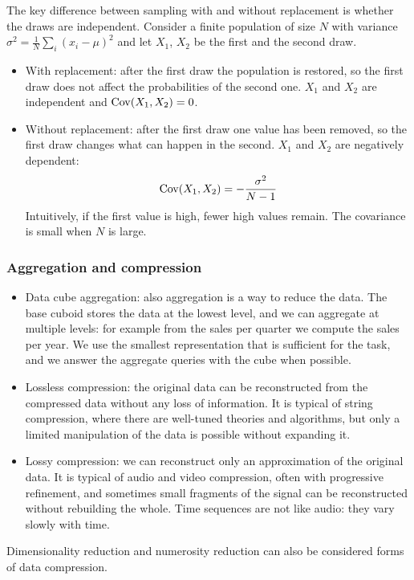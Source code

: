 The key difference between sampling with and without replacement is whether the draws are independent. Consider a finite population of size $N$ with variance $\sigma^2 = \frac{1}{N}\sum_i (x_i-\mu)^2$ and let $X_1$, $X_2$ be the first and the second draw.
\begin{itemize}
    \item With replacement: after the first draw the population is restored, so the first draw does not affect the probabilities of the second one. $X_1$ and $X_2$ are independent and $\operatorname{Cov}(X_1,X_2)=0$.
    \item Without replacement: after the first draw one value has been removed, so the first draw changes what can happen in the second. $X_1$ and $X_2$ are negatively dependent:
    \[
        \operatorname{Cov}(X_1,X_2) = -\frac{\sigma^2}{N-1}
    \]
    Intuitively, if the first value is high, fewer high values remain. The covariance is small when $N$ is large.
\end{itemize}

\subsubsection{Aggregation and compression}
\begin{itemize}
    \item Data cube aggregation: also aggregation is a way to reduce the data. The base cuboid stores the data at the lowest level, and we can aggregate at multiple levels: for example from the sales per quarter we compute the sales per year. We use the smallest representation that is sufficient for the task, and we answer the aggregate queries with the cube when possible.
    \item Lossless compression: the original data can be reconstructed from the compressed data without any loss of information. It is typical of string compression, where there are well-tuned theories and algorithms, but only a limited manipulation of the data is possible without expanding it.
    \item Lossy compression: we can reconstruct only an approximation of the original data. It is typical of audio and video compression, often with progressive refinement, and sometimes small fragments of the signal can be reconstructed without rebuilding the whole. Time sequences are not like audio: they vary slowly with time.
\end{itemize}
Dimensionality reduction and numerosity reduction can also be considered forms of data compression.

